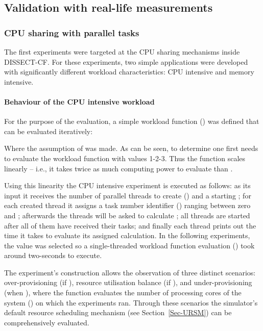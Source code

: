 \documentclass[sort, compress, 5p]{elsarticle}
\begin{document}
\subsection{Validation with real-life measurements}

\subsubsection{CPU sharing with parallel tasks}\label{SEC-CPUSHARE}


The first experiments were targeted at the CPU sharing mechanisms inside DISSECT-CF. For these experiments, two simple applications were developed with significantly different workload characteristics:  CPU intensive and  memory intensive.

\paragraph{Behaviour of the CPU intensive workload} 
For the purpose of the evaluation, a simple workload function () was defined that can be evaluated iteratively:

Where the assumption of  was made. As can be seen, to determine  one first needs to evaluate the workload function with values 1-2-3. Thus the function scales linearly -- i.e., it takes twice as much computing power to evaluate  than .

Using this linearity the CPU intensive experiment is executed as follows:  as its input it receives the number of parallel threads to create () and a starting ;  for each created thread it assigns a task number identifier () ranging between zero and ;  afterwards the threads will be asked to calculate ;  all threads are started after all of them have received their tasks; and finally  each thread prints out the time it takes to evaluate its assigned calculation. In the following experiments, the  value was selected so a single-threaded workload function evaluation () took around two-seconds to execute.

The experiment's construction allows the observation of three distinct scenarios:  over-provisioning (if ),  resource utilisation balance (if ), and  under-provisioning (when ), where the  function evaluates the number of processing cores of the system () on which the experiments ran. Through these scenarios the simulator's default resource scheduling mechanism (see Section~\ref{Sec-URSM}) can be comprehensively evaluated.
\end{document}
